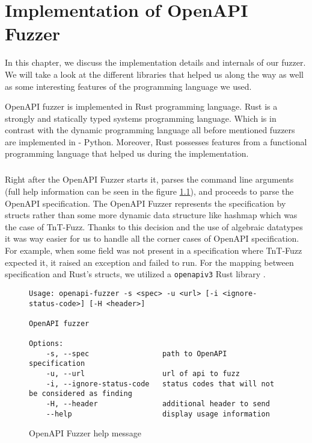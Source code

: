 \chapter{Implementation of OpenAPI Fuzzer}
In this chapter, we discuss the implementation details and internals of our fuzzer. We will take a look at the different libraries that helped us along the way as well as some interesting features of the programming language we used.

OpenAPI fuzzer is implemented in Rust programming language. Rust is a strongly and statically typed systems programming language. Which is in contrast with the dynamic programming language all before mentioned fuzzers are implemented in - Python. Moreover, Rust possesses features from a functional programming language that helped us during the implementation.

\paragraph{}
Right after the OpenAPI Fuzzer starts it, parses the command line arguments (full help information can be seen in the figure \ref{fig:openapi-fuzzer-help}), and proceeds to parse the OpenAPI specification. The OpenAPI Fuzzer represents the specification by structs rather than some more dynamic data structure like hashmap which was the case of TnT-Fuzz. Thanks to this decision and the use of algebraic datatypes it was way easier for us to handle all the corner cases of OpenAPI specification. For example, when some field was not present in a specification where TnT-Fuzz expected it, it raised an exception and failed to run. For the mapping between specification and Rust's structs, we utilized a \texttt{openapiv3} Rust library \cite{openapiv32020github}.

\begin{figure}
\begin{verbatim}
Usage: openapi-fuzzer -s <spec> -u <url> [-i <ignore-status-code>] [-H <header>]

OpenAPI fuzzer

Options:
    -s, --spec                 path to OpenAPI specification
    -u, --url                  url of api to fuzz
    -i, --ignore-status-code   status codes that will not be considered as finding
    -H, --header               additional header to send
    --help                     display usage information
\end{verbatim}
\caption{OpenAPI Fuzzer help message}
\label{fig:openapi-fuzzer-help}
\end{figure}

